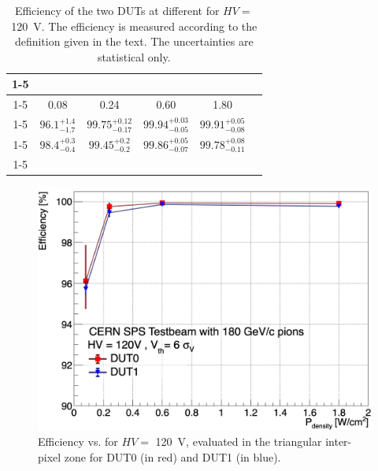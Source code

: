 		\begin{table}[h]
			\centering
			\renewcommand{\arraystretch}{1.3}
			\begin{tabular}{c|cccc|l}
				\cline{1-5}
				\multicolumn{5}{|c|}{Efficiency measured at HV = 120 V}                                                                                                                         & \multicolumn{1}{c}{\textbf{}} \\ \cline{1-5}
				\multicolumn{1}{|c|}{\power [W/cm$^2$]} & \multicolumn{1}{c|}{0.08} & \multicolumn{1}{c|}{0.24} & \multicolumn{1}{c|}{0.60} & 1.80 &                               \\ \cline{1-5}
				\multicolumn{1}{|c|}{Efficiency DUT0 {[}\%{]}} & \multicolumn{1}{c|}{$ 96.1_{-1.7}^{+1.4} $} & \multicolumn{1}{c|}{$ 99.75_{-0.17}^{+0.12} $} & \multicolumn{1}{c|}{$ 99.94_{-0.05}^{+0.03} $} & $ 99.91_{-0.08}^{+0.05} $ &                               \\ \cline{1-5}
				\multicolumn{1}{|c|}{Efficiency DUT1 {[}\%{]}} & \multicolumn{1}{c|}{$ 98.4_{-0.4}^{+0.3} $} & \multicolumn{1}{c|}{$ 99.45_{-0.2}^{+0.2} $}   & \multicolumn{1}{c|}{$ 99.86_{-0.07}^{+0.05} $} & $ 99.78_{-0.11}^{+0.08} $ &                               \\ \cline{1-5}
			\end{tabular}
			\caption{Efficiency of the two DUTs at different \power for $ HV =$ \SI{120}{\volt}. The efficiency is measured according to the definition given in the text. The uncertainties are statistical only.}
			\label{tab:ATTRACT_efftable}
		\end{table}
		
		\begin{figure}[h]
			\centering 
			\includegraphics[width=0.65\linewidth]{files/ATTRACT_paper/eff_vs_power}
			\caption{Efficiency vs. \power for $ HV =$ \SI{120}{\volt}, evaluated in the triangular inter-pixel zone for  DUT0 (in red) and DUT1 (in blue).}
			\label{im:ATTRACT_effipreampscan} 
		\end{figure}

